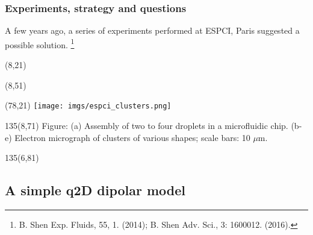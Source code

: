 \begin{frame}[t]
  \frametitle{Experiments, strategy and questions}

  A few years ago, a series of experiments performed at ESPCI, Paris suggested a possible solution.%
  \footnote{B. Shen \etal Exp. Fluids, 55, 1. (2014); B. Shen \etal Adv. Sci., 3: 1600012. (2016).}
  
  \begin{textblock}{80}(8,21)    
  \end{textblock}
  \begin{textblock}{80}(8,51)    
  \end{textblock}
  \begin{textblock}{80}(78,21)    
    \texttt{[image: imgs/espci\_clusters.png]}
  \end{textblock}
  \begin{textblock}{135}(8,71)    
    Figure: (a) Assembly of two to four droplets in a microfluidic chip.
    (b-e) Electron micrograph of clusters of various shapes; scale bars: 10 $\mu$m.
  \end{textblock}

  \begin{textblock}{135}(6,81)  
  \end{textblock}
  
\end{frame}

\hypertarget{dipolar}{%
  \subsection{A simple q2D dipolar model}}

